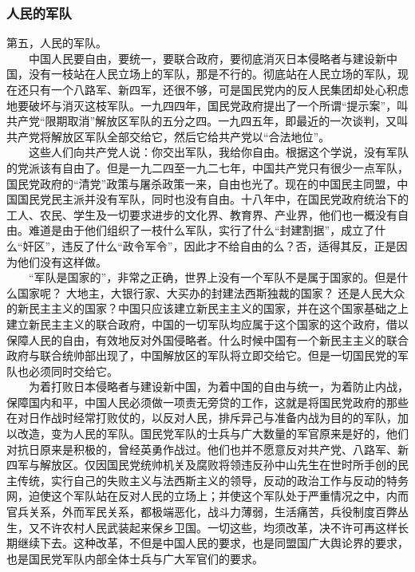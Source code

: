 \documentclass[cn,11pt,chinese]{elegantbook}
\def\myformat#1{\hfil\hfil #1}
\begin{document}
\subsubsection*{\myformat{人民的军队}}
第五，人民的军队。\\
　　中国人民要自由，要统一，要联合政府，要彻底消灭日本侵略者与建设新中国，没有一枝站在人民立场上的军队，那是不行的。彻底站在人民立场的军队，现在还只有一个八路军、新四军，还很不够，可是国民党内的反人民集团却处心积虑地要破坏与消灭这枝军队。一九四四年，国民党政府提出了一个所谓“提示案”，叫共产党“限期取消”解放区军队的五分之四。一九四五年，即最近的一次谈判，又叫共产党将解放区军队全部交给它，然后它给共产党以“合法地位”。\\
　　这些人们向共产党人说：你交出军队，我给你自由。根据这个学说，没有军队的党派该有自由了。但是一九二四至一九二七年，中国共产党只有很少一点军队，国民党政府的“清党”政策与屠杀政策一来，自由也光了。现在的中国民主同盟，中国国民党民主派并没有军队，同时也没有自由。十八年中，在国民党政府统治下的工人、农民、学生及一切要求进步的文化界、教育界、产业界，他们也一概没有自由。难道是由于他们组织了一枝什么军队，实行了什么“封建割据”，成立了什么“奸区”，违反了什么“政令军令”，因此才不给自由的么？否，适得其反，正是因为他们没有这样做。\\
　　“军队是国家的”，非常之正确，世界上没有一个军队不是属于国家的。但是什么国家呢？ 大地主，大银行家、大买办的封建法西斯独裁的国家？ 还是人民大众的新民主主义的国家？中国只应该建立新民主主义的国家，并在这个国家基础之上建立新民主主义的联合政府，中国的一切军队均应属于这个国家的这个政府，借以保障人民的自由，有效地反对外国侵略者。什么时候中国有一个新民主主义的联合政府与联合统帅部出现了，中国解放区的军队将立即交给它。但是一切国民党的军队也必须同时交给它。\\
　　为着打败日本侵略者与建设新中国，为着中国的自由与统一，为着防止内战，保障国内和平，中国人民必须做一项责无旁贷的工作，这就是将国民党政府的那些在对日作战时经常打败仗的，以反对人民，排斥异己与准备内战为目的的军队，加以改造，变为人民的军队。国民党军队的士兵与广大数量的军官原来是好的，他们对抗日原来是积极的，曾经英勇作战过。他们也并不愿意反对共产党、八路军、新四军与解放区。仅因国民党统帅机关及腐败将领违反孙中山先生在世时所手创的民主传统，实行自己的失败主义与法西斯主义的领导，反动的政治工作与反动的特务网，迫使这个军队站在反对人民的立场上；并使这个军队处于严重情况之中，内而官兵关系，外而军民关系，都极端恶化，战斗力薄弱，生活痛苦，兵役制度百弊丛生，又不许农村人民武装起来保乡卫国。一切这些，均须改革，决不许可再这样长期继续下去。这种改革，不但是中国人民的要求，也是同盟国广大舆论界的要求，也是国民党军队内部全体士兵与广大军官们的要求。\\
\end{document}
